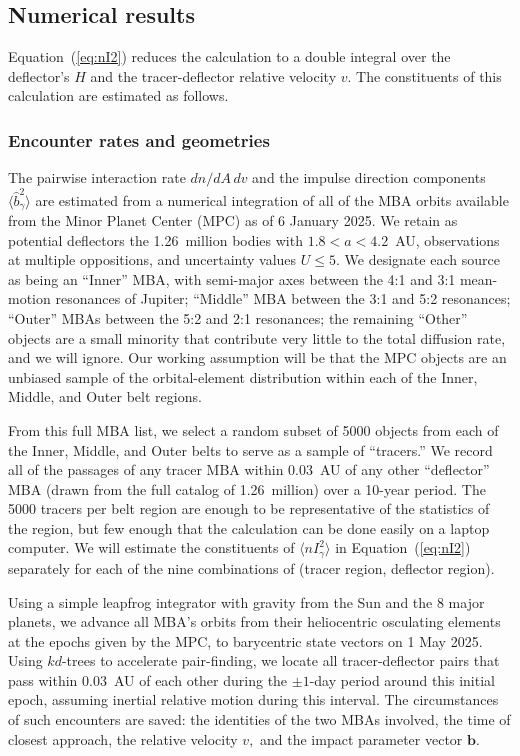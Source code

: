 \documentclass[linenumbers, onecolumn]{aastex631}
\newcommand{\eqq}[1]{Equation~(\ref{#1})}
\newcommand{\vecb}{\mathbf{b}}
\begin{document}
\subsection{Numerical results}
\eqq{eq:nI2} reduces the calculation to a double integral over the
deflector's $H$ and the tracer-deflector relative velocity $v.$  The
constituents of this calculation are estimated as follows.

\subsubsection{Encounter rates and geometries}
The pairwise interaction rate $dn/dA\,dv$ and the impulse direction
components $\langle \hat b^2_\gamma \rangle$ are estimated from a
numerical integration of all of the MBA orbits available
from the Minor Planet Center (MPC) as of 6 January 2025.   We retain as
potential deflectors the 1.26~million bodies with $1.8<a<4.2$~AU,
observations at multiple oppositions, and uncertainty values $U\le5.$
We designate each source as being an ``Inner'' MBA, with semi-major axes between the 4:1 and 3:1
mean-motion resonances of Jupiter; ``Middle'' MBA between the 3:1 and
5:2 resonances; ``Outer'' MBAs between the 5:2 and 2:1
resonances; the remaining ``Other'' objects are a small minority that
contribute very little to the total diffusion rate, and we will ignore.  Our working
assumption will be that the MPC objects are an unbiased sample of the
orbital-element distribution within each of the Inner, Middle, and
Outer belt regions.

From this full MBA list, we select a random subset of 5000 objects
from each of the Inner, Middle, and Outer belts to serve as a sample
of ``tracers.''  We record all of the passages of any tracer MBA
within 0.03~AU of any other ``deflector'' MBA (drawn from the full
catalog of 1.26~million) over a 10-year period.  The 5000 tracers per
belt region are enough to be representative of the statistics of
the region, but few enough that the calculation can be done easily
on a laptop computer.
We will estimate the constituents of  $\langle nI_\gamma^2\rangle$ in
\eqq{eq:nI2} separately for each of the nine combinations of (tracer region, deflector region). 


Using a simple leapfrog integrator with gravity from the Sun and the 8
major planets, we advance all MBA's orbits from their heliocentric
osculating elements at the epochs given by the MPC, to barycentric
state vectors on 1 May 2025.  Using $kd$-trees to accelerate
pair-finding, we locate all tracer-deflector pairs
that pass within 0.03~AU of each other during the $\pm1$-day period
around this initial epoch, assuming inertial relative motion during
this interval.  The circumstances of such encounters are saved: the
identities of the two MBAs involved, the time of closest approach, the
relative velocity $v,$ and the impact parameter vector $\vecb.$
\end{document}
